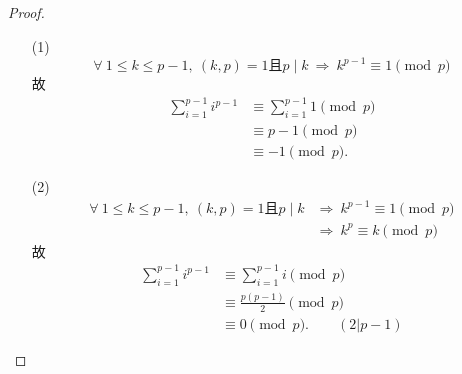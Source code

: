 \documentclass[UTF8]{ctexart}
\begin{document}
\subsection{}   %
\begin{proof}
    \begin{enumerate}
        \item []
        \item [(1)]
        \[
            \forall\ 1\leq k \leq p-1,\ 
            (k,p)=1\mbox{且}p\mid k
            \ \Rightarrow\ 
            k^{p-1} \equiv 1 \pmod{p}
        \]
        故
        \begin{align*}
            \sum\limits_{i=1}^{p-1} i^{p-1}
            & \equiv 
            \sum\limits_{i=1}^{p-1} 1 \pmod{p}\\
            & \equiv
            p-1 \pmod{p}\\
            & \equiv
            -1 \pmod{p}.
        \end{align*}
        \item [(2)]
        \begin{align*}
            \forall\ 1\leq k \leq p-1,\ 
            (k,p)=1\mbox{且}p\mid k
            & \Rightarrow\ 
            k^{p-1} \equiv 1 \pmod{p}\\
            & \Rightarrow\ 
            k^{p} \equiv k \pmod{p}
        \end{align*}
        故
        \begin{align*}
            \sum\limits_{i=1}^{p-1} i^{p-1}
            & \equiv 
            \sum\limits_{i=1}^{p-1} i \pmod{p}\\
            & \equiv
            \displaystyle{\frac{p(p-1)}{2}} \pmod{p}\\
            & \equiv
            0 \pmod{p}.\qquad (2|p-1)
        \end{align*}
    \end{enumerate}
\end{proof}
\end{document}
